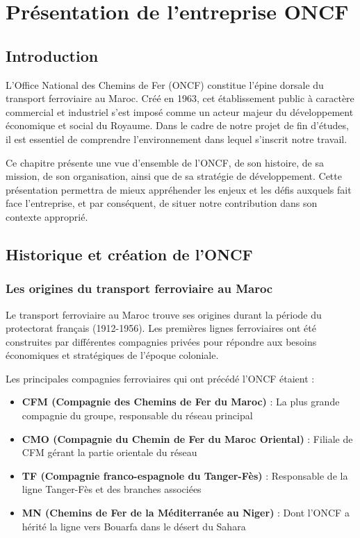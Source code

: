 \chapter{Présentation de l'entreprise ONCF}

\section{Introduction}

L'Office National des Chemins de Fer (ONCF) constitue l'épine dorsale du transport ferroviaire au Maroc. Créé en 1963, cet établissement public à caractère commercial et industriel s'est imposé comme un acteur majeur du développement économique et social du Royaume. Dans le cadre de notre projet de fin d'études, il est essentiel de comprendre l'environnement dans lequel s'inscrit notre travail.

Ce chapitre présente une vue d'ensemble de l'ONCF, de son histoire, de sa mission, de son organisation, ainsi que de sa stratégie de développement. Cette présentation permettra de mieux appréhender les enjeux et les défis auxquels fait face l'entreprise, et par conséquent, de situer notre contribution dans son contexte approprié.

\section{Historique et création de l'ONCF}

\subsection{Les origines du transport ferroviaire au Maroc}

Le transport ferroviaire au Maroc trouve ses origines durant la période du protectorat français (1912-1956). Les premières lignes ferroviaires ont été construites par différentes compagnies privées pour répondre aux besoins économiques et stratégiques de l'époque coloniale.

Les principales compagnies ferroviaires qui ont précédé l'ONCF étaient :
\begin{itemize}
    \item \textbf{CFM (Compagnie des Chemins de Fer du Maroc)} : La plus grande compagnie du groupe, responsable du réseau principal
    \item \textbf{CMO (Compagnie du Chemin de Fer du Maroc Oriental)} : Filiale de CFM gérant la partie orientale du réseau
    \item \textbf{TF (Compagnie franco-espagnole du Tanger-Fès)} : Responsable de la ligne Tanger-Fès et des branches associées
    \item \textbf{MN (Chemins de Fer de la Méditerranée au Niger)} : Dont l'ONCF a hérité la ligne vers Bouarfa dans le désert du Sahara
\end{itemize}

